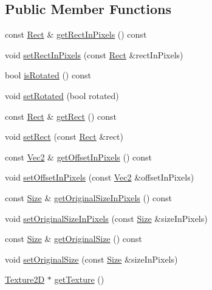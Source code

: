 \subsection*{Public Member Functions}
\begin{DoxyCompactItemize}
\item 
const \hyperlink{classRect}{Rect} \& \hyperlink{classSpriteFrame_a4fe04d5adcc732b7f8f772f3020a2af5}{get\+Rect\+In\+Pixels} () const
\item 
void \hyperlink{classSpriteFrame_a7807d131620f961dd2ebc379c856f132}{set\+Rect\+In\+Pixels} (const \hyperlink{classRect}{Rect} \&rect\+In\+Pixels)
\item 
bool \hyperlink{classSpriteFrame_adefd8284eab4b8582aef36e339ee4f29}{is\+Rotated} () const
\item 
void \hyperlink{classSpriteFrame_ac047765c8364710cf04c99e9b723c84c}{set\+Rotated} (bool rotated)
\item 
const \hyperlink{classRect}{Rect} \& \hyperlink{classSpriteFrame_a7caab90d4ee888a3260f36c52146ca6d}{get\+Rect} () const
\item 
void \hyperlink{classSpriteFrame_a97b4f437895f61f48aa6462930a5c298}{set\+Rect} (const \hyperlink{classRect}{Rect} \&rect)
\item 
const \hyperlink{classVec2}{Vec2} \& \hyperlink{classSpriteFrame_ad7c8997479c5360667a9369bf61f16d7}{get\+Offset\+In\+Pixels} () const
\item 
void \hyperlink{classSpriteFrame_a4429cffc4fd0910e0d80b456a319162b}{set\+Offset\+In\+Pixels} (const \hyperlink{classVec2}{Vec2} \&offset\+In\+Pixels)
\item 
const \hyperlink{classSize}{Size} \& \hyperlink{classSpriteFrame_ad1dd3ee536ab1374f915713fe9520673}{get\+Original\+Size\+In\+Pixels} () const
\item 
void \hyperlink{classSpriteFrame_ae9686ba8c8e9353f9bed4644e2c7d7e6}{set\+Original\+Size\+In\+Pixels} (const \hyperlink{classSize}{Size} \&size\+In\+Pixels)
\item 
const \hyperlink{classSize}{Size} \& \hyperlink{classSpriteFrame_a84fd321bbc5f807dd5a5c48e371c7058}{get\+Original\+Size} () const
\item 
void \hyperlink{classSpriteFrame_a59473dbd75737dee69855a0c7acf913f}{set\+Original\+Size} (const \hyperlink{classSize}{Size} \&size\+In\+Pixels)
\item 
\hyperlink{classTexture2D}{Texture2D} $\ast$ \hyperlink{classSpriteFrame_a9f4d9c339580bab0ae2c8026b386a4ce}{get\+Texture} ()
\item 

\end{DoxyCompactItemize}
